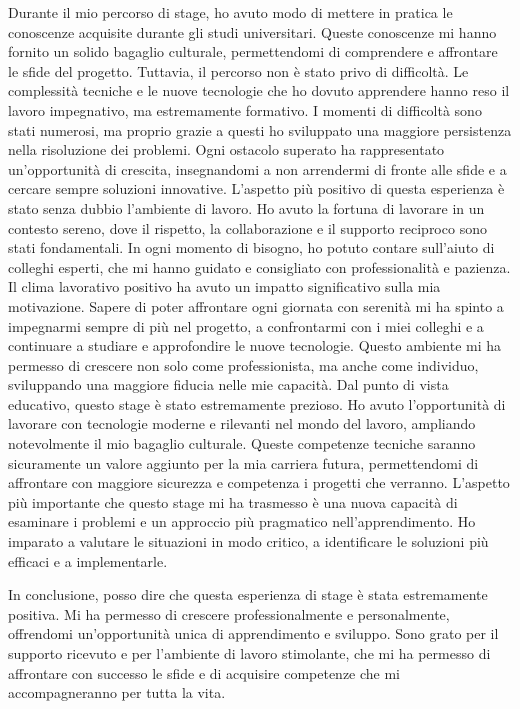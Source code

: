 Durante il mio percorso di stage, ho avuto modo di mettere in pratica le conoscenze acquisite durante gli studi universitari.
Queste conoscenze mi hanno fornito un solido bagaglio culturale, permettendomi di comprendere e affrontare le sfide del progetto.
Tuttavia, il percorso non è stato privo di difficoltà. Le complessità tecniche e le nuove tecnologie che ho dovuto apprendere hanno reso il lavoro impegnativo, ma estremamente formativo.
I momenti di difficoltà sono stati numerosi, ma proprio grazie a questi ho sviluppato una maggiore persistenza nella risoluzione dei problemi.
Ogni ostacolo superato ha rappresentato un'opportunità di crescita, insegnandomi a non arrendermi di fronte alle sfide e a cercare sempre soluzioni innovative.
L'aspetto più positivo di questa esperienza è stato senza dubbio l'ambiente di lavoro. Ho avuto la fortuna di lavorare in un contesto sereno, dove il rispetto, la collaborazione e il supporto reciproco sono stati fondamentali.
In ogni momento di bisogno, ho potuto contare sull'aiuto di colleghi esperti, che mi hanno guidato e consigliato con professionalità e pazienza.
Il clima lavorativo positivo ha avuto un impatto significativo sulla mia motivazione. Sapere di poter affrontare ogni giornata con serenità mi ha spinto a impegnarmi sempre di più nel progetto, a confrontarmi con i miei colleghi e a continuare a studiare e approfondire le nuove tecnologie.
Questo ambiente mi ha permesso di crescere non solo come professionista, ma anche come individuo, sviluppando una maggiore fiducia nelle mie capacità.
Dal punto di vista educativo, questo stage è stato estremamente prezioso. Ho avuto l'opportunità di lavorare con tecnologie moderne e rilevanti nel mondo del lavoro, ampliando notevolmente il mio bagaglio culturale.
Queste competenze tecniche saranno sicuramente un valore aggiunto per la mia carriera futura, permettendomi di affrontare con maggiore sicurezza e competenza i progetti che verranno.
L'aspetto più importante che questo stage mi ha trasmesso è una nuova capacità di esaminare i problemi e un approccio più pragmatico nell'apprendimento.
Ho imparato a valutare le situazioni in modo critico, a identificare le soluzioni più efficaci e a implementarle.

\pagebreak
In conclusione, posso dire che questa esperienza di stage è stata estremamente positiva. Mi ha permesso di crescere professionalmente e personalmente, offrendomi un'opportunità unica di apprendimento e sviluppo. Sono grato per il supporto ricevuto e per l'ambiente di lavoro stimolante, che mi ha permesso di affrontare con successo le sfide e di acquisire competenze che mi accompagneranno per tutta la vita.


\newpage